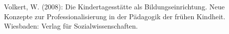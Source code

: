 Volkert, W. (2008): Die Kindertagesstätte als Bildungseinrichtung. Neue Konzepte zur Professionalisierung in der Pädagogik der frühen Kindheit. Wiesbaden: Verlag für Sozialwissenschaften.



